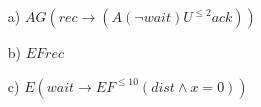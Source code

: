 

\begin{itemize}
	\item[a)] $AG(rec \rightarrow (A(\neg wait)U^{\leq2} ack))$ 
	\item[b)] $EF rec$
	\item[c)] $E(wait \rightarrow EF^{\leq 10}(dist \wedge x=0))$
	
\end{itemize}